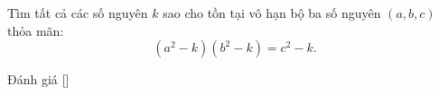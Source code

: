 \ifshowproblem
\begin{problem}\label{problem:RUS-2015-TST-D10-P3}
    Tìm tất cả các số nguyên \( k \) sao cho tồn tại vô hạn bộ ba số nguyên \( (a, b, c) \) thỏa mãn:
    \[
        (a^2 - k)(b^2 - k) = c^2 - k.
    \]    
\end{problem}
\fi

\ifshowinfo
Đánh giá [\textbf{}]\footnotemark
{}
\fi